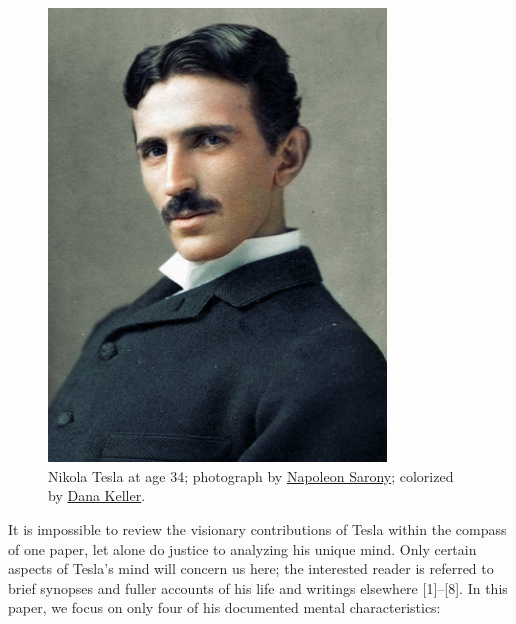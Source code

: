 \documentclass[
  11pt,
  a4paper,
]{article}
\begin{document}
\begin{figure}
\hypertarget{fig:tesla}{%
\centering
\includegraphics[width=0.8\textwidth,height=\textheight]{images/tesla_in_color.jpg}
\caption[Nikola Tesla at age 34; photograph by
\href{https://en.wikipedia.org/wiki/Napoleon_Sarony}{Napoleon Sarony};
colorized by \href{http://www.danarkeller.com/}{Dana Keller}.]{Nikola
Tesla at age 34; photograph by
\href{https://en.wikipedia.org/wiki/Napoleon_Sarony}{Napoleon Sarony};
colorized by \href{http://www.danarkeller.com/}{Dana
Keller}.\footnotemark{}}\label{fig:tesla}
}
\end{figure}

It is impossible to review the visionary contributions of Tesla within
the compass of one paper, let alone do justice to analyzing his unique
mind. Only certain aspects of Tesla's mind will concern us here; the
interested reader is referred to brief synopses and fuller accounts of
his life and writings elsewhere {[}1{]}--{[}8{]}. In this paper, we
focus on only four of his documented mental characteristics:
\end{document}
